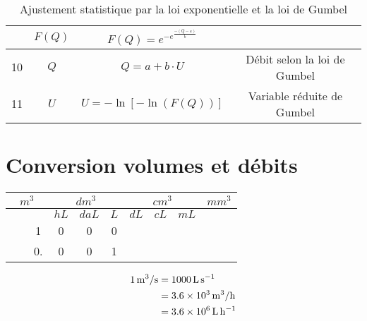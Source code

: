 \begin{table}[H]
\begin{tabular}{c|c|c|c}
        \hdashline                   
        9  & $F(Q)$                             & $F(Q) = e^{-e^{\frac{- \left(Q-a\right)}{b}}}$                                                                                            & \\
        \hline
        10  & $Q$                               & $Q = a + b \cdot U$                                                                                                                       & Débit selon la loi de Gumbel \\
        \hline
        11 & $U$                                & $U = -\ln \left[ -\ln \left(F(Q)\right)\right]$                                                                                          & Variable réduite de Gumbel   \\
    \end{tabular}
    \caption{Ajustement statistique par la loi exponentielle et la loi de Gumbel}
    \label{tab:loiGumbelAjuste}
\end{table}

\section{Conversion volumes et débits}
\begin{table}[h!]
    \centering
    \begin{tabular}{|c|c|c|c|c|c|c|c|c|c|c|c|}
        \hline
        \multicolumn{3}{|c|}{\textbf{$m^3$}} & \multicolumn{3}{|c|}{\textbf{$dm^3$}} & \multicolumn{3}{|c|}{\textbf{$cm^3$}} & \multicolumn{3}{|c|}{\textbf{$mm^3$}} \\
        \hline
         & &                                 & $hL$ & $daL$ & $L$                    & $dL$ & $cL$ & $mL$                    & & & \\
        \hline \hline
         & &                               1 & 0    &   0   & 0                      & & &                                   & & & \\  
        \hline
         & &                              0. & 0    &   0   & 1                     & & &                                   & & & \\
        \hline
    \end{tabular}
\end{table}

\begin{align*}
    \qty{1}{\metre^3 \per\second} &= \qty{1000}{\litre\per\second}   \\
           &= \qty{3.6e3}{\metre^3 \per\hour} \\
           &= \qty{3.6e6}{\litre\per\hour} \\
\end{align*}

